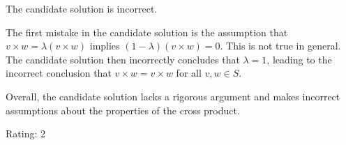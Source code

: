 The candidate solution is incorrect.

The first mistake in the candidate solution is the assumption that $v \times w = \lambda(v \times w)$ implies $(1-\lambda)(v \times w) = 0$. This is not true in general. The candidate solution then incorrectly concludes that $\lambda = 1$, leading to the incorrect conclusion that $v \times w = v \times w$ for all $v, w \in S$.

Overall, the candidate solution lacks a rigorous argument and makes incorrect assumptions about the properties of the cross product. 

Rating: 2
